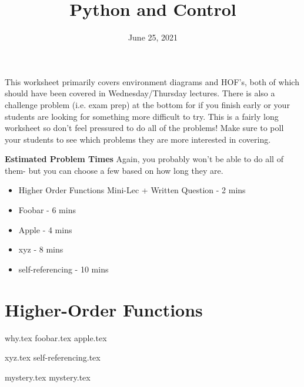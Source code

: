 \documentclass{exam}
\title{Python and Control}
\date{June 25, 2021}
\begin{document}
\maketitle


\begin{blocksection}
\begin{guide}

  This worksheet primarily covers environment diagrams and HOF's, both of which should have been covered in Wednesday/Thursday lectures.
There is also a challenge problem (i.e. exam prep) at the bottom for if you finish early or your students are looking for something more difficult to try.
This is a fairly long worksheet so don't feel pressured to do all of the problems! Make sure to poll your students to see which problems they are more interested in covering.

\textbf{Estimated Problem Times}
\newline
Again, you probably won't be able to do all of them- but you can choose a few based on how long they are.
\begin{itemize}
    \item Higher Order Functions Mini-Lec + Written Question - 2 mins
    \item Foobar - 6 mins
    \item Apple - 4 mins
    \item xyz - 8 mins
    \item self-referencing - 10 mins
\end{itemize}
\end{guide}
\end{blocksection}




\section{Higher-Order Functions}
\begin{questions}
{why.tex}
{foobar.tex}
{apple.tex}

\newpage
{xyz.tex}
{self-referencing.tex}

\newpage
{mystery.tex}
{mystery.tex}

\clearpage

\end{questions}
\end{document}
